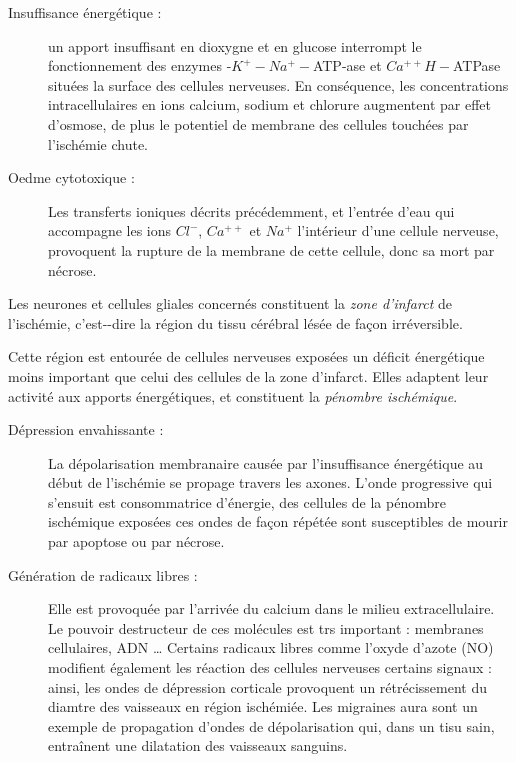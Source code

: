 \begin{description}
\item[Insuffisance \'energ\'etique :] un apport insuffisant en dioxygne et en glucose %
interrompt le fonctionnement des enzymes -$K^+ - Na^+-$ATP-ase et $Ca^{++}H-$ATPase situ\'ees  la surface des cellules nerveuses. %
En cons\'equence, les concentrations intracellulaires en ions calcium, sodium et chlorure augmentent par effet d'osmose, %
de plus le potentiel de membrane des cellules touch\'ees par l'isch\'emie chute.
\item[Oedme cytotoxique :] Les transferts ioniques d\'ecrits pr\'ec\'edemment, et l'entr\'ee d'eau qui accompagne les ions $Cl^-$, %
$Ca^{++}$ et $Na^+$  l'int\'erieur d'une cellule nerveuse, provoquent la rupture de la membrane de cette cellule, donc sa mort par n\'ecrose.
\end{description}

Les neurones et cellules gliales concern\'es constituent la \emph{zone d'infarct} de l'isch\'emie, %
c'est--dire la r\'egion du tissu c\'er\'ebral l\'es\'ee de fa\c con irr\'eversible.

\par
Cette r\'egion est entour\'ee de cellules nerveuses expos\'ees  %
un d\'eficit \'energ\'etique moins important que celui des cellules de la zone d'infarct. %
Elles adaptent leur activit\'e aux apports \'energ\'etiques, et constituent la \emph{p\'enombre isch\'emique}.

\begin{description}
\item[D\'epression envahissante :] La d\'epolarisation membranaire caus\'ee par l'insuffisance \'energ\'etique au d\'ebut de l'isch\'emie se propage  travers les axones. %
L'onde progressive qui s'ensuit est consommatrice d'\'energie, des cellules de la p\'enombre isch\'emique expos\'ees  ces ondes de fa\c con r\'ep\'et\'ee %
sont susceptibles de mourir par apoptose ou par n\'ecrose.
\item[G\'en\'eration de radicaux libres :] Elle est provoqu\'ee par l'arriv\'ee du calcium dans le milieu extracellulaire. %
Le pouvoir destructeur de ces mol\'ecules est trs important : membranes cellulaires, ADN \dots %
Certains radicaux libres comme l'oxyde d'azote (NO) modifient \'egalement les r\'eaction des cellules nerveuses  certains signaux :
ainsi, les ondes de d\'epression corticale provoquent un r\'etr\'ecissement du diamtre des vaisseaux en r\'egion isch\'emi\'ee. %
Les migraines  aura sont un exemple de propagation d'ondes de d\'epolarisation qui, dans un tisu sain, entra\^inent une dilatation des vaisseaux sanguins.
\end{description}

